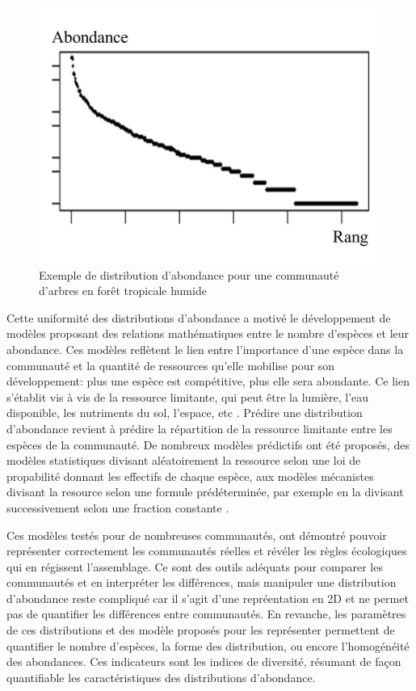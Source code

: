 \documentclass[
  11pt,
  french,
  A4paper,
  extrafontsizes,onecolumn,openright
  ]{memoir}
\begin{document}
\begin{figure}

{\centering \includegraphics[width=0.6\linewidth]{ExternalFig/SpeciesAbdDist} 

}

\caption{Exemple de distribution d'abondance pour une communauté d'arbres en forêt tropicale humide}\label{fig:AbdDist}
\end{figure}

Cette uniformité des distributions d'abondance a motivé le développement
de modèles proposant des relations mathématiques entre le nombre
d'espèces et leur abondance. Ces modèles reflètent le lien entre
l'importance d'une espèce dans la communauté et la quantité de
ressources qu'elle mobilise pour son développement: plus une espèce est
compétitive, plus elle sera abondante. Ce lien s'établit vis à vis de la
ressource limitante, qui peut être la lumière, l'eau disponible, les
nutriments du sol, l'espace, etc
\autocites{Silvertown2004}{terSteege2006}. Prédire une distribution
d'abondance revient à prédire la répartition de la ressource limitante
entre les espèces de la communauté. De nombreux modèles prédictifs ont
été proposés, des modèles statistiques divisant aléatoirement la
ressource selon une loi de propabilité donnant les effectifs de chaque
espèce, aux modèles mécanistes divisant la resource selon une formule
prédéterminée, par exemple en la divisant successivement selon une
fraction constante
\autocites{Fisher1943}{Motomura1932}{Tokeshi1993}{Magurran1988}.

Ces modèles testés pour de nombreuses communautés, ont démontré pouvoir
représenter correctement les communautés réelles et révéler les règles
écologiques qui en régissent l'assemblage. Ce sont des outils adéquats
pour comparer les communautés et en interpréter les différences, mais
manipuler une distribution d'abondance reste compliqué car il s'agit
d'une repréentation en 2D et ne permet pas de quantifier les différences
entre communautés. En revanche, les paramètres de ces distributions et
des modèle proposés pour les représenter permettent de quantifier le
nombre d'espèces, la forme des distribution, ou encore l'homogénéité des
abondances. Ces indicateurs sont les indices de diversité, résumant de
façon quantifiable les caractéristiques des distributions d'abondance.
\end{document}
